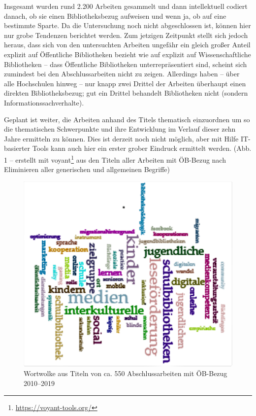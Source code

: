 \documentclass[a4paper,
fontsize=11pt,
oneside,
numbers=noperiodatend,
parskip=half-,
bibliography=totoc,
final
]{scrartcl}
\begin{document}
Insgesamt wurden rund 2.200 Arbeiten gesammelt und dann intellektuell
codiert danach, ob sie einen Bibliotheksbezug aufweisen und wenn ja, ob
auf eine bestimmte Sparte. Da die Untersuchung noch nicht abgeschlossen
ist, können hier nur grobe Tendenzen berichtet werden. Zum jetzigen
Zeitpunkt stellt sich jedoch heraus, dass sich von den untersuchten
Arbeiten ungefähr ein gleich großer Anteil explizit auf Öffentliche
Bibliotheken bezieht wie auf explizit auf Wissenschaftliche Bibliotheken
-- dass Öffentliche Bibliotheken unterrepräsentiert sind, scheint sich
zumindest bei den Abschlussarbeiten nicht zu zeigen. Allerdings haben --
über alle Hochschulen hinweg -- nur knapp zwei Drittel der Arbeiten
überhaupt einen direkten Bibliotheksbezug; gut ein Drittel behandelt
Bibliotheken nicht (sondern Informationssachverhalte).

Geplant ist weiter, die Arbeiten anhand des Titels thematisch
einzuordnen um so die thematischen Schwerpunkte und ihre Entwicklung im
Verlauf dieser zehn Jahre ermitteln zu können. Dies ist derzeit noch
nicht möglich, aber mit Hilfe IT-basierter Tools kann auch hier ein
erster grober Eindruck ermittelt werden. (Abb. 1 -- erstellt mit
voyant\footnote{\url{https://voyant-tools.org/}} aus den Titeln aller
Arbeiten mit ÖB-Bezug nach Eliminieren aller generischen und allgemeinen
Begriffe)

\begin{figure}
\centering
\includegraphics{img/image1.png}
\caption{Wortwolke aus Titeln von ca. 550 Abschlussarbeiten mit ÖB-Bezug
2010--2019}
\end{figure}
\end{document}
